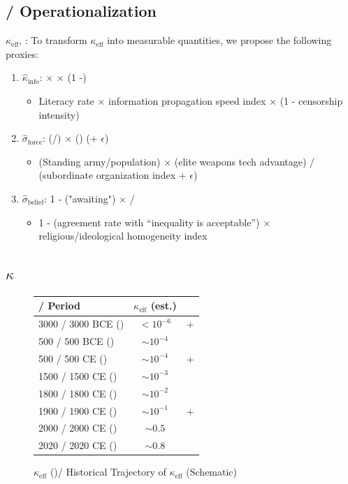\documentclass[11pt,a4paper]{article}
\theoremstyle{definition}
\newcommand{\coupling}{\kappa}
\newcommand{\suppress}{\sigma}
\begin{document}
\subsection{ / Operationalization}
 $\coupling_{\text{eff}}$, : 
To transform $\coupling_{\text{eff}}$ into measurable quantities, we propose the following proxies:
\begin{enumerate}
 \item $\widehat{\coupling}_{\text{info}}$: $\times$ $\times$ (1 -)
 \begin{itemize}
 \item Literacy rate $\times$ information propagation speed index $\times$ (1 - censorship intensity)
 \end{itemize}
 \item $\widehat{\suppress}_{\text{force}}$: (/) $\times$ ()
 (+ $\epsilon$)
 \begin{itemize}
 \item (Standing army/population) $\times$ (elite weapons tech advantage) /
 (subordinate organization index + $\epsilon$)
 \end{itemize}
 \item $\widehat{\suppress}_{\text{belief}}$: 1 - ("awaiting")
 $\times$ /
 \begin{itemize}
 \item 1 - (agreement rate with ``inequality is acceptable'') $\times$
 religious/ideological homogeneity index
 \end{itemize}
\end{enumerate}
\subsection{ $\coupling$}
\begin{figure}[htbp]
\centering
\caption{$\coupling_{\text{eff}}$ ()/ Historical Trajectory of $\coupling_{\text{eff}}$ (Schematic)}
\label{fig:trajectory}
\begin{tabular}{@{}lcc@{}}
\toprule
\textbf{ / Period} & \textbf{$\coupling_{\text{eff}}$ (est.)} &  \\
\midrule
3000 / 3000 BCE () & $< 10^{-6}$ & + \\
500 / 500 BCE () & $\sim 10^{-4}$ & \\
500 / 500 CE () & $\sim 10^{-4}$ & + \\
1500 / 1500 CE () & $\sim 10^{-3}$ & \\
1800 / 1800 CE () & $\sim 10^{-2}$ & \\
1900 / 1900 CE () & $\sim 10^{-1}$ & + \\
2000 / 2000 CE () & $\sim 0.5$ & \\
2020 / 2020 CE () & $\sim 0.8$ & \\
\bottomrule
\end{tabular}
\end{figure}
\end{document}
